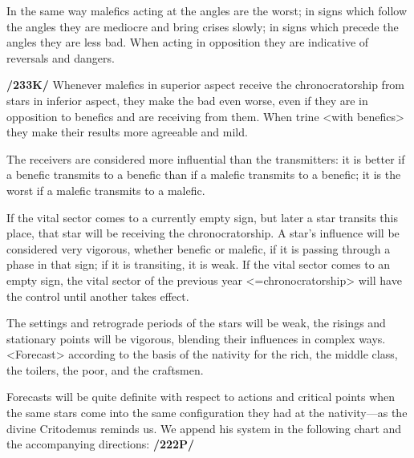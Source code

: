 In the same way malefics acting at the angles are the worst; in signs which follow the angles they are mediocre and bring crises slowly; in signs which precede the angles they are less bad. When acting in opposition they are indicative of reversals and dangers.

\textbf{/233K/} Whenever malefics in superior aspect receive the chronocratorship from stars in inferior aspect, they make the bad even worse, even if they are in opposition to benefics and are receiving from them. When trine <with benefics> they make their results more agreeable and mild. 

The receivers are considered more influential than the transmitters: it is better if a benefic transmits to a benefic than if a malefic transmits to a benefic; it is the worst if a malefic transmits to a malefic. 

If the vital sector comes to a currently empty sign, but later a star transits this place, that star will be receiving the chronocratorship. A
star’s influence will be considered very vigorous, whether benefic or malefic, if it is passing through a phase in that sign; if it is transiting, it is weak. If the vital sector comes to an empty sign, the vital sector of the previous year <=chronocratorship> will have the control until another takes effect.

The settings and retrograde periods of the stars will be weak, the risings and stationary points will be vigorous, blending their influences in complex ways. <Forecast> according to the basis of the nativity for the rich, the middle class, the toilers, the poor, and the craftsmen.

Forecasts will be quite definite with respect to actions and critical points when the same stars come into the same configuration they had at the nativity—as the divine Critodemus reminds us. We append his system in the following chart and the accompanying directions: \textbf{/222P/}

